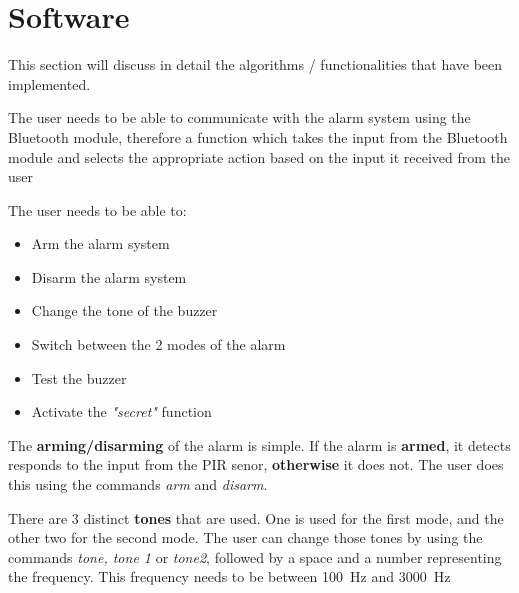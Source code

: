 \documentclass[a4paper,12pt]{report}
\begin{document}
\vspace{5mm}

\section{Software}

This section will discuss in detail the algorithms / functionalities that have been implemented.

\vspace{5mm}

The user needs to be able to communicate with the alarm system using the Bluetooth module, therefore a function which takes the input from the Bluetooth module and selects the appropriate action based on the input it received from the user 

\vspace{5mm}

The user needs to be able to:

\begin{itemize}

\item Arm the alarm system
\item Disarm the alarm system
\item Change the tone of the buzzer
\item Switch between the 2 modes of the alarm
\item Test the buzzer
\item Activate the \emph{"secret"} function 

\end{itemize}

\vspace{5mm}

The \textbf{arming/disarming} of the alarm is simple. If the alarm is \textbf{armed}, it detects responds to the input from the PIR senor, \textbf{otherwise} it does not. The user does this using the commands \emph{arm} and \emph{disarm}.

\vspace{5mm}

There are 3 distinct \textbf{tones} that are used. One is used for the first mode, and the other two for the second mode. The user can change those tones by using the commands \emph{tone, tone 1} or \emph{tone2}, followed by a space and a number representing the frequency. This frequency needs to be between \SI{100}{\hertz} and  \SI{3000}{\hertz}

\vspace{5mm}
\end{document}
